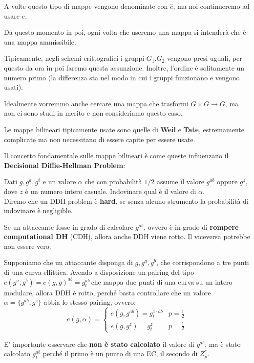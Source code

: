 \begin{note}
A volte questo tipo di mappe vengono denominate con $\hat{e}$, ma noi continueremo ad usare $e$.
\end{note}
\begin{remark}
Da questo momento in poi, ogni volta che useremo una mappa si intenderà che è una mappa ammissibile.
\end{remark}
Tipicamente, negli schemi crittografici i gruppi $G_1.G_2$ vengono presi uguali, per questo da ora in poi faremo questa assunzione. Inoltre, l'ordine è solitamente un numero primo (la differenza sta nel modo in cui i gruppi funzionano e vengono usati).\\
\begin{remark}
Idealmente vorremmo anche cercare una mappa che trasformi $G\times G\longrightarrow G$, ma non ci sono studi in merito e non consideriamo questo caso.
\end{remark}
\begin{note}
Le mappe bilineari tipicamente usate sono quelle di \textbf{Weil} e \textbf{Tate}, estremamente complicate ma non necessitano di essere capite per essere usate.
\end{note}
Il concetto fondamentale sulle mappe bilineari è come queste influenzano il \textbf{Decisional Diffie-Hellman Problem}:
\begin{definition}\label{def:ddh}
Dati $g,g^a,g^b$ e un valore $\alpha$ che con probabilità $1/2$ assume il valore $g^{ab}$ oppure $g^z$, dove $z$ è un numero intero casuale. Indovinare qual è il valore di $\alpha$.\\
Diremo che un DDH-problem è \textbf{hard}, se senza alcuno strumento la probabilità di indovinare è negligible.
\end{definition}
\begin{note}
Se un attaccante fosse in grado di calcolare $g^{ab}$, ovvero è in grado di \textbf{rompere computational DH} (CDH), allora anche DDH viene rotto. Il viceversa potrebbe non essere vero.
\end{note}
\begin{example}
Supponiamo che un attaccante disponga di $g,g^a,g^b$, che corrispondono a tre punti di una curva ellittica. Avendo a disposizione un pairing del tipo $e(g^a,g^b)=e(g,g)^{ab}=g_t^{ab}$\footnotemark \,che mappa due punti di una curva su un intero modulare, allora DDH è rotto, perché basta controllare che un valore $\alpha=\{g^{ab},g^{z}\}$ abbia lo stesso pairing, ovvero: 
\[
e(g,\alpha)=\begin{cases}
e(g,g^{ab})=g^{1\cdot ab}_t&p=\frac{1}{2}\\
e(g,g^z)=g^z_t&p=\frac{1}{2}
\end{cases}
\]
\begin{note}
E' importante osservare che \textbf{non è stato calcolato} il valore di $g^{ab}$, ma è stato calcolato $g_t^{ab}$ perché il primo è un punto di una EC, il secondo di $Z_p^*$.
\end{note}
\end{example}
